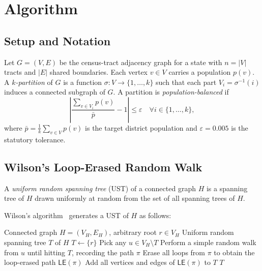 \section{Algorithm}
\label{sec:algorithm}

\subsection{Setup and Notation}

Let $G = (V, E)$ be the census-tract adjacency graph for a state with
$n = |V|$ tracts and $|E|$ shared boundaries.
Each vertex $v \in V$ carries a population $p(v)$.
A \emph{$k$-partition} of $G$ is a function $\sigma: V \to \{1,\ldots,k\}$
such that each part $V_i = \sigma^{-1}(i)$ induces a connected subgraph
of $G$.
A partition is \emph{population-balanced} if
\[
  \left|\frac{\sum_{v \in V_i} p(v)}{\bar{p}} - 1\right| \leq \varepsilon
  \quad \forall i \in \{1,\ldots,k\},
\]
where $\bar{p} = \frac{1}{k}\sum_{v \in V} p(v)$ is the target district
population and $\varepsilon = 0.005$ is the statutory tolerance.

\subsection{Wilson's Loop-Erased Random Walk}

\begin{definition}
A \emph{uniform random spanning tree} (UST) of a connected graph $H$
is a spanning tree of $H$ drawn uniformly at random from the set of
all spanning trees of $H$.
\end{definition}

Wilson's algorithm~\citep{wilson1996generating} generates a UST of $H$
as follows:

\begin{algorithm}
\caption{Wilson's UST Algorithm}
\label{alg:wilson}
\begin{algorithmic}[1]
\Require Connected graph $H = (V_H, E_H)$, arbitrary root $r \in V_H$
\Ensure Uniform random spanning tree $T$ of $H$
\State $T \leftarrow \{r\}$
  \State Pick any $u \in V_H \setminus T$
  \State Perform a simple random walk from $u$ until hitting $T$, recording the path $\pi$
  \State Erase all loops from $\pi$ to obtain the loop-erased path $\mathsf{LE}(\pi)$
  \State Add all vertices and edges of $\mathsf{LE}(\pi)$ to $T$
\EndWhile
\State \Return $T$
\end{algorithmic}
\end{algorithm}

